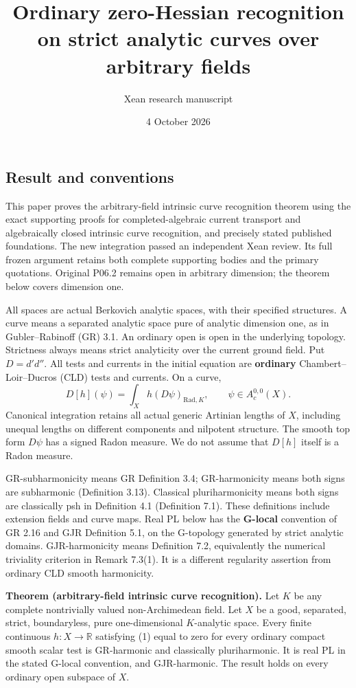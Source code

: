 \documentclass[
  11pt,
]{article}
\title{Ordinary zero-Hessian recognition on strict analytic curves over
arbitrary fields}
\author{Xean research manuscript}
\date{4 October 2026}
\begin{document}
\maketitle

\subsection{Result and conventions}\label{result-and-conventions}

This paper proves the arbitrary-field intrinsic curve recognition theorem
using the exact supporting proofs for completed-algebraic current transport
and algebraically closed intrinsic curve recognition, and precisely stated
published foundations. The new integration passed an independent Xean
review. Its full frozen argument retains both complete supporting bodies
and the primary quotations. Original P06.2 remains open in arbitrary
dimension; the theorem below covers dimension one.

All spaces are actual Berkovich analytic spaces, with their specified
structures. A curve means a separated analytic space pure of analytic
dimension one, as in Gubler--Rabinoff (GR) 3.1. An ordinary open is open
in the underlying topology. Strictness always means strict analyticity
over the current ground field. Put \(D=d'd''\). All tests and currents
in the initial equation are \textbf{ordinary} Chambert--Loir--Ducros
(CLD) tests and currents. On a curve, \[
 D[h](\psi)=\int_X h(D\psi)_{\mathrm{Rad},K},
 \qquad \psi\in A_c^{0,0}(X).                         \tag{1}
\] Canonical integration retains all actual generic Artinian lengths of
\(X\), including unequal lengths on different components and nilpotent
structure. The smooth top form \(D\psi\) has a signed Radon measure. We
do not assume that \(D[h]\) itself is a Radon measure.

GR-subharmonicity means GR Definition 3.4; GR-harmonicity means both
signs are subharmonic (Definition 3.13). Classical pluriharmonicity
means both signs are classically psh in Definition 4.1 (Definition 7.1).
These definitions include extension fields and curve maps. Real PL below
has the \textbf{G-local} convention of GR 2.16 and GJR Definition 5.1,
on the G-topology generated by strict analytic domains. GJR-harmonicity
means Definition 7.2, equivalently the numerical triviality criterion in
Remark 7.3(1). It is a different regularity assertion from ordinary CLD
smooth harmonicity.

\textbf{Theorem (arbitrary-field intrinsic curve recognition).} Let
\(K\) be any complete nontrivially valued non-Archimedean field. Let
\(X\) be a good, separated, strict, boundaryless, pure one-dimensional
\(K\)-analytic space. Every finite continuous \(h:X\to\mathbb{R}\)
satisfying (1) equal to zero for every ordinary compact smooth scalar
test is GR-harmonic and classically pluriharmonic. It is real PL in the
stated G-local convention, and GJR-harmonic. The result holds on every
ordinary open subspace of \(X\).
\end{document}
